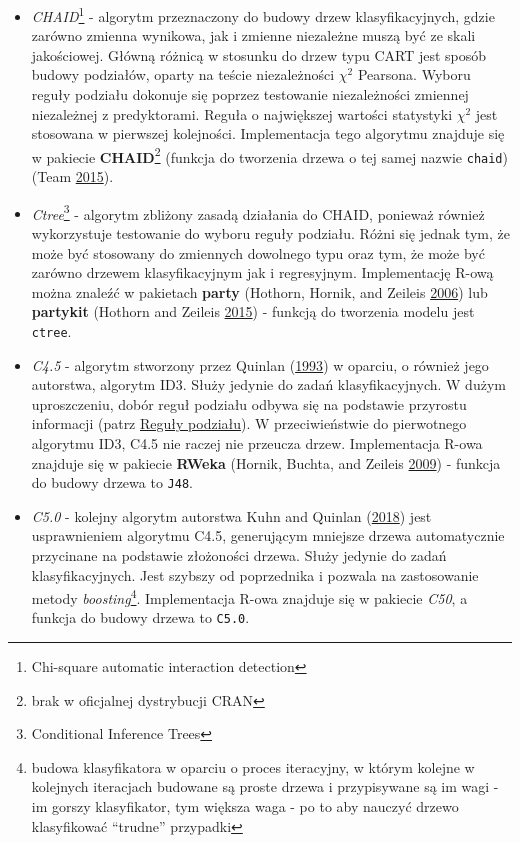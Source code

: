 \documentclass[]{book}
\providecommand{\tightlist}{%
  \setlength{\itemsep}{0pt}\setlength{\parskip}{0pt}}
\let\rmarkdownfootnote\footnote%
\def\footnote{\protect\rmarkdownfootnote}
\theoremstyle{plain}
\theoremstyle{definition}
\theoremstyle{definition}
\theoremstyle{definition}
\theoremstyle{definition}
\theoremstyle{remark}
\begin{document}
\begin{itemize}
\tightlist
\item
  \emph{CHAID}\footnote{Chi-square automatic interaction detection} - algorytm przeznaczony do budowy drzew klasyfikacyjnych, gdzie zarówno zmienna wynikowa, jak i zmienne niezależne muszą być ze skali jakościowej. Główną różnicą w stosunku do drzew typu CART jest sposób budowy podziałów, oparty na teście niezależności \(\chi^2\) Pearsona. Wyboru reguły podziału dokonuje się poprzez testowanie niezależności zmiennej niezależnej z predyktorami. Reguła o największej wartości statystyki \(\chi^2\) jest stosowana w pierwszej kolejności. Implementacja tego algorytmu znajduje się w pakiecie \textbf{CHAID}\footnote{brak w oficjalnej dystrybucji CRAN} (funkcja do tworzenia drzewa o tej samej nazwie \texttt{chaid}) (Team \protect\hyperlink{ref-R-CHAID}{2015}).
\item
  \emph{Ctree}\footnote{Conditional Inference Trees} - algorytm zbliżony zasadą działania do CHAID, ponieważ również wykorzystuje testowanie do wyboru reguły podziału. Różni się jednak tym, że może być stosowany do zmiennych dowolnego typu oraz tym, że może być zarówno drzewem klasyfikacyjnym jak i regresyjnym. Implementację R-ową można znaleźć w pakietach \textbf{party} (Hothorn, Hornik, and Zeileis \protect\hyperlink{ref-R-party}{2006}) lub \textbf{partykit} (Hothorn and Zeileis \protect\hyperlink{ref-R-partykit}{2015}) - funkcją do tworzenia modelu jest \texttt{ctree}.
\item
  \emph{C4.5} - algorytm stworzony przez Quinlan (\protect\hyperlink{ref-quinlan1993}{1993}) w oparciu, o również jego autorstwa, algorytm ID3. Służy jedynie do zadań klasyfikacyjnych. W dużym uproszczeniu, dobór reguł podziału odbywa się na podstawie przyrostu informacji (patrz \protect\hyperlink{reguy-podziau}{Reguły podziału}). W przeciwieństwie do pierwotnego algorytmu ID3, C4.5 nie raczej nie przeucza drzew. Implementacja R-owa znajduje się w pakiecie \textbf{RWeka} (Hornik, Buchta, and Zeileis \protect\hyperlink{ref-R-Rweka}{2009}) - funkcja do budowy drzewa to \texttt{J48}.
\item
  \emph{C5.0} - kolejny algorytm autorstwa Kuhn and Quinlan (\protect\hyperlink{ref-R-C50}{2018}) jest usprawnieniem algorytmu C4.5, generującym mniejsze drzewa automatycznie przycinane na podstawie złożoności drzewa. Służy jedynie do zadań klasyfikacyjnych. Jest szybszy od poprzednika i pozwala na zastosowanie metody \emph{boosting}\footnote{budowa klasyfikatora w oparciu o proces iteracyjny, w którym kolejne w kolejnych iteracjach budowane są proste drzewa i przypisywane są im wagi - im gorszy klasyfikator, tym większa waga - po to aby nauczyć drzewo klasyfikować ``trudne'' przypadki}. Implementacja R-owa znajduje się w pakiecie \emph{C50}, a funkcja do budowy drzewa to \texttt{C5.0}.
\end{itemize}
\end{document}
